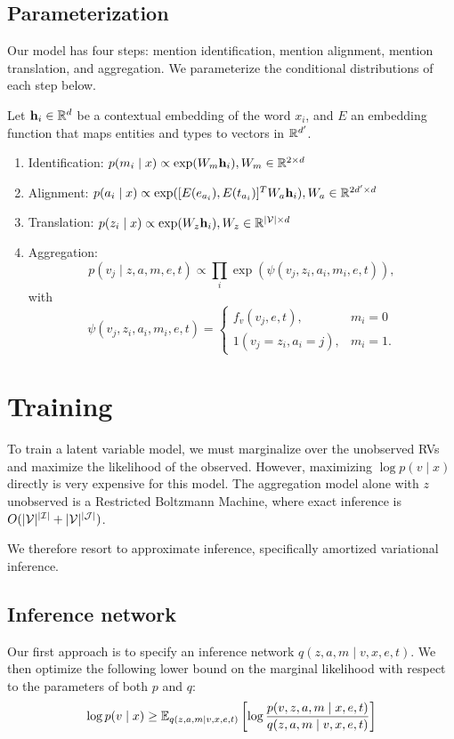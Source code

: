 \documentclass[12pt]{article}
\begin{document}
\subsection{Parameterization}
Our model has four steps: mention identification, mention alignment, 
mention translation, and aggregation.
We parameterize the conditional distributions of each step below.

Let $\mathbf{h}_i \in \mathbb{R}^d$ be a contextual embedding of the word $x_i$,
and $E$ an embedding function that maps entities and types
to vectors in $\mathbb{R}^{d'}$.
\begin{enumerate}
\item Identification: $p(m_i \mid x) \propto \exp(W_m\mathbf{h}_i), W_m \in \mathbb{R}^{2 \times d}$
\item Alignment: $p(a_i \mid x) \propto \exp([E(e_{a_i}), E(t_{a_i})]^TW_a \mathbf{h}_i),
W_a \in \mathbb{R}^{2d' \times d}$ 
\item Translation: $p(z_i \mid x) \propto \exp(W_z \mathbf{h}_i), W_z \in \mathbb{R}^{|\mathcal{V}| \times d}$
\item Aggregation: 
$$p(v_j \mid z,a,m,e,t) \propto \prod_i \exp(\psi(v_j, z_i, a_i, m_i,e,t)),$$
with
$$
\psi(v_j, z_i, a_i, m_i,e,t) = \begin{cases}
f_v(v_j,e,t), & m_i = 0 \\
1(v_j = z_i, a_i = j), & m_i = 1.
\end{cases}
$$
\end{enumerate}

\section{Training}
To train a latent variable model, we must marginalize over the unobserved RVs
and maximize the likelihood of the observed.
However, maximizing $\log p(v \mid x)$ directly is very expensive for this model.
The aggregation model alone with $z$ unobserved is a Restricted Boltzmann Machine,
where exact inference is $O(|\mathcal{V}|^{|\mathcal{I}|} + |\mathcal{V}|^{|\mathcal{J}|})$.

We therefore resort to approximate inference,
specifically amortized variational inference.

\subsection{Inference network}
Our first approach is to specify an inference network $q(z,a,m\mid v,x,e,t)$.
We then optimize the following lower bound on the marginal likelihood
with respect to the parameters of both $p$ and $q$:
\begin{equation}
\label{eqn:lowerbound}
\log p(v\mid x) \geq
\mathbb{E}_{q(z,a,m\mid v,x,e,t)}\left[\log \frac{p(v,z,a,m\mid x,e,t)}{q(z,a,m\mid v,x,e,t)}\right]
\end{equation}
\end{document}
